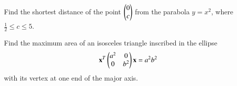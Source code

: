 \item Find the shortest distance of the point $\begin{pmatrix}0\\c\end{pmatrix}$ from the parabola $y = x^2$, where $\frac{1}{2} \le c \le 5$.
\item Find the maximum area of an isosceles triangle inscribed in the ellipse 
%
\begin{align}
\mathbf{x}^T\begin{pmatrix}a^2 & 0 \\ 0 & b^2\end{pmatrix}\mathbf{x} = a^2b^2
\end{align}
%
with its vertex at one end of the major axis.
